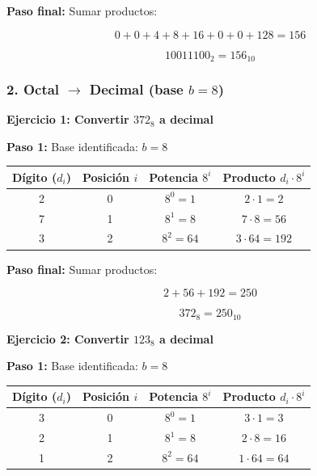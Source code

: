 \documentclass[12pt,twoside]{book}
\begin{document}
						\noindent
						\textbf{Paso final:} Sumar productos:
						
						\[
						0 + 0 + 4 + 8 + 16 + 0 + 0 + 128 = 156
						\]
						
						\[
						10011100_2 = 156_{10}
						\]
						
						\subsubsection*{2. Octal $\rightarrow$ Decimal (base $b=8$)}
						
						\noindent
						\textbf{Ejercicio 1: Convertir $372_8$ a decimal}
						
						\noindent
						\textbf{Paso 1:} Base identificada: $b=8$
						
						\begin{center}
							\begin{tabular}{c|c|c|c}
								Dígito ($d_i$) & Posición $i$ & Potencia $8^i$ & Producto $d_i\cdot 8^i$ \\
								\hline
								2 & 0 & $8^0=1$   & $2\cdot 1 = 2$ \\
								7 & 1 & $8^1=8$   & $7\cdot 8 = 56$ \\
								3 & 2 & $8^2=64$  & $3\cdot 64 = 192$ \\
							\end{tabular}
						\end{center}
						
						\noindent
						\textbf{Paso final:} Sumar productos:
						
						\[
						2 + 56 + 192 = 250
						\]
						
						\[
						372_8 = 250_{10}
						\]
						
						\noindent
						\textbf{Ejercicio 2: Convertir $123_8$ a decimal}
						
						\noindent
						\textbf{Paso 1:} Base identificada: $b=8$
						
						\begin{center}
							\begin{tabular}{c|c|c|c}
								Dígito ($d_i$) & Posición $i$ & Potencia $8^i$ & Producto $d_i\cdot 8^i$ \\
								\hline
								3 & 0 & $8^0=1$  & $3\cdot 1 = 3$ \\
								2 & 1 & $8^1=8$  & $2\cdot 8 = 16$ \\
								1 & 2 & $8^2=64$ & $1\cdot 64 = 64$ \\
							\end{tabular}
						\end{center}
						
\end{document}
